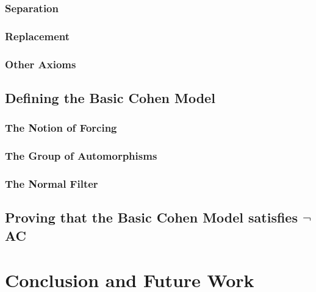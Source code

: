 \documentclass{report}
\begin{document}
\subsection{Separation}
\subsection{Replacement}
\subsection{Other Axioms}

\section{Defining the Basic Cohen Model}
\subsection{The Notion of Forcing}
\subsection{The Group of Automorphisms}
\subsection{The Normal Filter}

\section{Proving that the Basic Cohen Model satisfies $\neg$AC}

\chapter{Conclusion and Future Work}

\printbibliography
\end{document}
